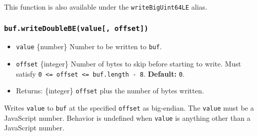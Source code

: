 This function is also available under the \texttt{writeBigUint64LE}
alias.

\subsubsection{\texorpdfstring{\texttt{buf.writeDoubleBE(value{[},\ offset{]})}}{buf.writeDoubleBE(value{[}, offset{]})}}\label{buf.writedoublebevalue-offset}

\begin{itemize}
\tightlist
\item
  \texttt{value} \{number\} Number to be written to \texttt{buf}.
\item
  \texttt{offset} \{integer\} Number of bytes to skip before starting to
  write. Must satisfy
  \texttt{0\ \textless{}=\ offset\ \textless{}=\ buf.length\ -\ 8}.
  \textbf{Default:} \texttt{0}.
\item
  Returns: \{integer\} \texttt{offset} plus the number of bytes written.
\end{itemize}

Writes \texttt{value} to \texttt{buf} at the specified \texttt{offset}
as big-endian. The \texttt{value} must be a JavaScript number. Behavior
is undefined when \texttt{value} is anything other than a JavaScript
number.

\begin{Shaded}
\begin{Highlighting}[]
\NormalTok{ \{ }\NormalTok{ \} } \OperatorTok{;}

\OperatorTok{=} \NormalTok{(}\NormalTok{)}\OperatorTok{;}

\NormalTok{(}\OperatorTok{,} \NormalTok{)}\OperatorTok{;}

\OperatorTok{;}
\end{Highlighting}
\end{Shaded}


